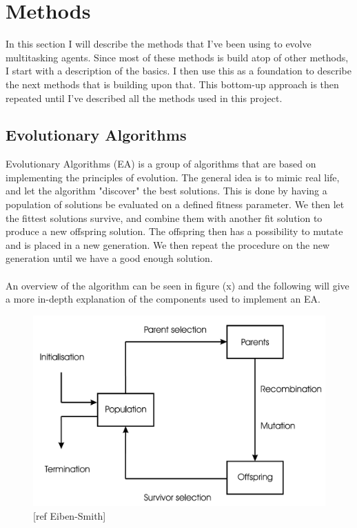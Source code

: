 \documentclass[11pt, a4paper]{article}
\begin{document}
\author{Mads Anthony}
\section{Methods}
In this section I will describe the methods that I've been using to evolve multitasking agents. Since most of these methods is build atop of other methods, I start with a description of the basics. I then use this as a foundation to describe the next methods that is building upon that. This bottom-up approach is then repeated until I've described all the methods used in this project.
\subsection{Evolutionary Algorithms}
Evolutionary Algorithms (EA) is a group of algorithms that are based on implementing the principles of evolution. The general idea is to mimic real life, and let the algorithm "discover" the best solutions. This is done by having a population of solutions be evaluated on a defined fitness parameter. We then let the fittest solutions survive, and combine them with another fit solution to produce a new offspring solution. The offspring then has a possibility to mutate and is placed in a new generation. We then repeat the procedure on the new generation until we have a good enough solution.
\\
\\
An overview of the algorithm can be seen in figure (x) and the following will give a more in-depth explanation of the components used to implement an EA.
\begin{figure}[!ht]
\centering
\includegraphics[scale=0.2]{EA_Figure}
\caption{[ref Eiben-Smith]}
\end{figure}
\end{document}
